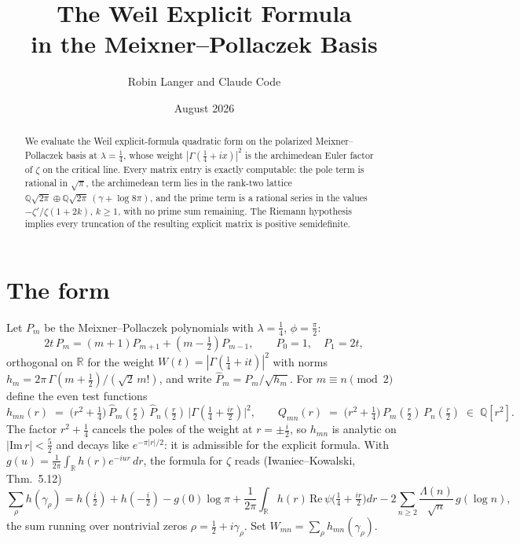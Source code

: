 \documentclass[11pt,a4paper]{article}
\title{\textbf{The Weil Explicit Formula\\ in the Meixner--Pollaczek Basis}}
\author{Robin Langer and Claude Code}
\date{August 2026}
\theoremstyle{remark}
\newcommand{\R}{\mathbb{R}}
\newcommand{\Q}{\mathbb{Q}}
\newcommand{\G}{\Gamma}
\begin{document}
\maketitle

\begin{abstract}
We evaluate the Weil explicit-formula quadratic form on the
polarized Meixner--Pollaczek basis at $\lambda=\tfrac14$, whose
weight $|\G(\tfrac14+ix)|^2$ is the archimedean Euler factor of
$\zeta$ on the critical line.  Every matrix entry is exactly
computable: the pole term is rational in $\sqrt{\pi}$, the
archimedean term lies in the rank-two lattice
$\Q\sqrt{2\pi}\oplus\Q\sqrt{2\pi}\,(\gamma+\log 8\pi)$, and the
prime term is a rational series in the values
$-\zeta'/\zeta(1+2k)$, $k\ge 1$, with no prime sum remaining.
The Riemann hypothesis implies every truncation of the resulting
explicit matrix is positive semidefinite.
\end{abstract}

\section{The form}

Let $P_m$ be the Meixner--Pollaczek polynomials with
$\lambda=\tfrac14$, $\phi=\tfrac\pi2$:
\[
2t\,P_m = (m+1)P_{m+1} + (m-\tfrac12)P_{m-1},
\qquad P_0 = 1,\quad P_1 = 2t,
\]
orthogonal on $\R$ for the weight $W(t)=|\G(\tfrac14+it)|^2$ with
norms $h_m = 2\pi\,\G(m+\tfrac12)/(\sqrt2\,m!)$, and write
$\widehat P_m = P_m/\sqrt{h_m}$.  For $m\equiv n \pmod 2$ define
the even test functions
\[
h_{mn}(r) \;=\; \bigl(r^2+\tfrac14\bigr)\,
\widehat P_m(\tfrac r2)\,\widehat P_n(\tfrac r2)\,
\bigl|\G(\tfrac14+\tfrac{ir}2)\bigr|^2 ,
\qquad
Q_{mn}(r) \;=\; \bigl(r^2+\tfrac14\bigr)\,
P_m(\tfrac r2)\,P_n(\tfrac r2)\;\in\;\Q[r^2].
\]
The factor $r^2+\tfrac14$ cancels the poles of the weight at
$r=\pm\tfrac i2$, so $h_{mn}$ is analytic on
$|\mathrm{Im}\,r| < \tfrac52$ and decays like
$e^{-\pi|r|/2}$: it is admissible for the explicit formula.  With
$g(u) = \tfrac1{2\pi}\int_\R h(r)e^{-iur}\,dr$, the formula for
$\zeta$ reads (Iwaniec--Kowalski, Thm.~5.12)
\[
\sum_{\rho} h(\gamma_\rho)
= h(\tfrac i2)+h(-\tfrac i2)
- g(0)\log\pi
+ \frac1{2\pi}\int_\R h(r)\,
   \mathrm{Re}\,\psi\bigl(\tfrac14+\tfrac{ir}2\bigr)dr
- 2\sum_{n\ge2}\frac{\Lambda(n)}{\sqrt n}\,g(\log n),
\]
the sum running over nontrivial zeros $\rho=\tfrac12+i\gamma_\rho$.
Set $W_{mn}=\sum_\rho h_{mn}(\gamma_\rho)$.
\end{document}
